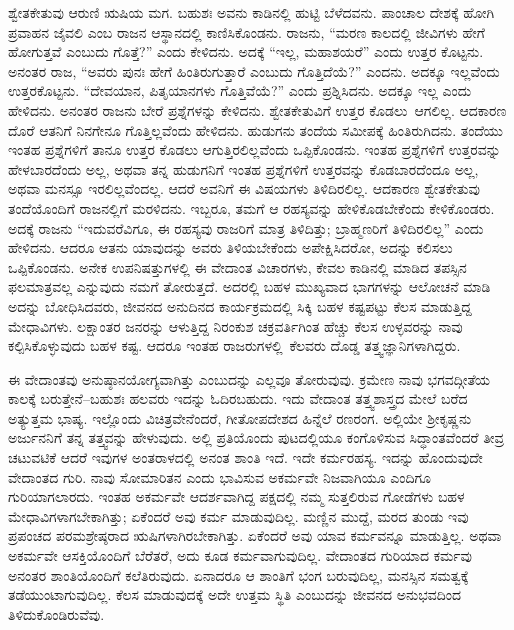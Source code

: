 ಶ್ವೇತಕೇತುವು ಆರುಣಿ ಋಷಿಯ ಮಗ. ಬಹುಶಃ ಅವನು ಕಾಡಿನಲ್ಲಿ ಹುಟ್ಟಿ ಬೆಳೆದವನು. ಪಾಂಚಾಲ ದೇಶಕ್ಕೆ ಹೋಗಿ ಪ್ರವಾಹನ ಜೈವಲಿ ಎಂಬ ರಾಜನ ಆಸ್ಥಾನದಲ್ಲಿ ಕಾಣಿಸಿಕೊಂಡನು. ರಾಜನು, “ಮರಣ ಕಾಲದಲ್ಲಿ ಜೀವಿಗಳು ಹೇಗೆ ಹೋಗುತ್ತವೆ ಎಂಬುದು ಗೊತ್ತೆ?” ಎಂದು ಕೇಳಿದನು. ಅದಕ್ಕೆ “ಇಲ್ಲ, ಮಹಾಶಯರೆ” ಎಂದು ಉತ್ತರ ಕೊಟ್ಟನು. ಅನಂತರ ರಾಜ, “ಅವರು ಪುನಃ ಹೇಗೆ ಹಿಂತಿರುಗುತ್ತಾರೆ ಎಂಬುದು ಗೊತ್ತಿದೆಯೆ?” ಎಂದನು. ಅದಕ್ಕೂ ಇಲ್ಲವೆಂದು ಉತ್ತರಕೊಟ್ಟನು. “ದೇವಯಾನ, ಪಿತೃಯಾನಗಳು ಗೊತ್ತಿವೆಯೆ?” ಎಂದು ಪ್ರಶ್ನಿಸಿದನು. ಅದಕ್ಕೂ ಇಲ್ಲ ಎಂದು ಹೇಳಿದನು. ಅನಂತರ ರಾಜನು ಬೇರೆ ಪ್ರಶ್ನೆಗಳನ್ನು ಕೇಳಿದನು. ಶ್ವೇತಕೇತುವಿಗೆ ಉತ್ತರ ಕೊಡಲು\break\ ಆಗಲಿಲ್ಲ. ಆದಕಾರಣ ದೊರೆ ಆತನಿಗೆ ನಿನಗೇನೂ ಗೊತ್ತಿಲ್ಲವೆಂದು ಹೇಳಿದನು. ಹುಡುಗನು ತಂದೆಯ ಸಮೀಪಕ್ಕೆ ಹಿಂತಿರುಗಿದನು. ತಂದೆಯು ಇಂತಹ ಪ್ರಶ್ನೆಗಳಿಗೆ ತಾನೂ ಉತ್ತರ ಕೊಡಲು ಆಗುತ್ತಿರಲಿಲ್ಲವೆಂದು ಒಪ್ಪಿಕೊಂಡನು. ಇಂತಹ ಪ್ರಶ್ನೆಗಳಿಗೆ ಉತ್ತರವನ್ನು ಹೇಳಬಾರದೆಂದು ಅಲ್ಲ, ಅಥವಾ ತನ್ನ ಹುಡುಗನಿಗೆ ಇಂತಹ ಪ್ರಶ್ನೆಗಳಿಗೆ ಉತ್ತರವನ್ನು ಕೊಡಬಾರದೆಂದೂ ಅಲ್ಲ, ಅಥವಾ ಮನಸ್ಸೂ ಇರಲಿಲ್ಲವೆಂದಲ್ಲ. ಆದರೆ ಅವನಿಗೆ ಈ ವಿಷಯಗಳು ತಿಳಿದಿರಲಿಲ್ಲ. ಆದಕಾರಣ ಶ್ವೇತಕೇತುವು ತಂದೆಯೊಂದಿಗೆ ರಾಜನಲ್ಲಿಗೆ ಮರಳಿದನು. ಇಬ್ಬರೂ, ತಮಗೆ ಆ ರಹಸ್ಯವನ್ನು ಹೇಳಿಕೊಡಬೇಕೆಂದು ಕೇಳಿಕೊಂಡರು. ಅದಕ್ಕೆ ರಾಜನು “ಇದುವರೆವಿಗೂ, ಈ ರಹಸ್ಯವು ರಾಜರಿಗೆ ಮಾತ್ರ ತಿಳಿದಿತ್ತು; ಬ್ರಾಹ್ಮಣರಿಗೆ ತಿಳಿದಿರಲಿಲ್ಲ” ಎಂದು ಹೇಳಿದನು. ಆದರೂ ಆತನು ಯಾವುದನ್ನು ಅವರು ತಿಳಿಯಬೇಕೆಂದು ಅಪೇಕ್ಷಿಸಿದರೋ, ಅದನ್ನು ಕಲಿಸಲು ಒಪ್ಪಿಕೊಂಡನು. ಅನೇಕ ಉಪನಿಷತ್ತುಗಳಲ್ಲಿ ಈ ವೇದಾಂತ ವಿಚಾರಗಳು, ಕೇವಲ ಕಾಡಿನಲ್ಲಿ ಮಾಡಿದ ತಪಸ್ಸಿನ ಫಲಮಾತ್ರವಲ್ಲ ಎನ್ನುವುದು ನಮಗೆ ತೋರುತ್ತದೆ. ಅದರಲ್ಲಿ ಬಹಳ ಮುಖ್ಯವಾದ ಭಾಗಗಳನ್ನು ಆಲೋಚನೆ ಮಾಡಿ ಅದನ್ನು ಬೋಧಿಸಿದವರು, ಜೀವನದ ಅನುದಿನದ ಕಾರ್ಯಕ್ರಮದಲ್ಲಿ ಸಿಕ್ಕಿ ಬಹಳ ಕಷ್ಟಪಟ್ಟು ಕೆಲಸ ಮಾಡುತ್ತಿದ್ದ ಮೇಧಾವಿಗಳು. ಲಕ್ಷಾಂತರ ಜನರನ್ನು ಆಳುತ್ತಿದ್ದ ನಿರಂಕುಶ ಚಕ್ರವರ್ತಿಗಿಂತ ಹೆಚ್ಚು ಕೆಲಸ ಉಳ್ಳವರನ್ನು ನಾವು ಕಲ್ಪಿಸಿಕೊಳ್ಳುವುದು ಬಹಳ ಕಷ್ಟ. ಆದರೂ ಇಂತಹ ರಾಜರುಗಳಲ್ಲಿ\break\  ಕೆಲವರು ದೊಡ್ಡ ತತ್ತ್ವಜ್ಞಾನಿಗಳಾಗಿದ್ದರು. 

\vskip  0.4cm

ಈ ವೇದಾಂತವು ಅನುಷ್ಠಾನಯೋಗ್ಯವಾಗಿತ್ತು ಎಂಬುದನ್ನು ಎಲ್ಲವೂ ತೋರುವುವು. ಕ್ರಮೇಣ ನಾವು ಭಗವದ್ಗೀತೆಯ ಕಾಲಕ್ಕೆ ಬರುತ್ತೇನೆ–ಬಹುಶಃ ಹಲವರು ಇದನ್ನು ಓದಿರಬಹುದು. ಇದು ವೇದಾಂತ ತತ್ತ್ವಶಾಸ್ತ್ರದ ಮೇಲೆ ಬರೆದ ಅತ್ಯುತ್ತಮ ಭಾಷ್ಯ. ಇಲ್ಲೊಂದು ವಿಚಿತ್ರವೇನೆಂದರೆ, ಗೀತೋಪದೇಶದ ಹಿನ್ನೆಲೆ ರಣರಂಗ. ಅಲ್ಲಿಯೇ ಶ‍್ರೀಕೃಷ್ಣನು ಅರ್ಜುನನಿಗೆ ತನ್ನ ತತ್ತ್ವವನ್ನು ಹೇಳುವುದು. ಅಲ್ಲಿ ಪ್ರತಿಯೊಂದು ಪುಟದಲ್ಲಿಯೂ ಕಂಗೊಳಿಸುವ ಸಿದ್ಧಾಂತವೆಂದರೆ ತೀವ್ರ ಚಟುವಟಿಕೆ ಆದರೆ ಇವುಗಳ ಅಂತರಾಳದಲ್ಲಿ ಅನಂತ ಶಾಂತಿ ಇದೆ. ಇದೇ ಕರ್ಮರಹಸ್ಯ. ಇದನ್ನು ಹೊಂದುವುದೇ ವೇದಾಂತದ ಗುರಿ. ನಾವು ಸೋಮಾರಿತನ ಎಂದು ಭಾವಿಸುವ ಅಕರ್ಮವೇ ನಿಜವಾಗಿಯೂ ಎಂದಿಗೂ ಗುರಿಯಾಗಲಾರದು. ಇಂತಹ ಅಕರ್ಮವೇ ಆದರ್ಶವಾಗಿದ್ದ ಪಕ್ಷದಲ್ಲಿ ನಮ್ಮ ಸುತ್ತಲಿರುವ ಗೋಡೆಗಳು ಬಹಳ ಮೇಧಾವಿಗಳಾಗಬೇಕಾಗಿತ್ತು; ಏಕೆಂದರೆ ಅವು ಕರ್ಮ ಮಾಡುವುದಿಲ್ಲ. ಮಣ್ಣಿನ ಮುದ್ದೆ, ಮರದ ತುಂಡು ಇವು ಪ್ರಪಂಚದ ಪರಮಶ್ರೇಷ್ಠರಾದ ಋಷಿಗಳಾಗಿರಬೇಕಾಗಿತ್ತು. ಏಕೆಂದರೆ ಅವು ಯಾವ ಕರ್ಮವನ್ನೂ ಮಾಡುತ್ತಿಲ್ಲ. ಅಥವಾ ಅಕರ್ಮವೇ ಆಸಕ್ತಿಯೊಂದಿಗೆ ಬೆರೆತರೆ, ಅದು ಕೂಡ ಕರ್ಮವಾಗುವುದಿಲ್ಲ. ವೇದಾಂತದ ಗುರಿಯಾದ ಕರ್ಮವು ಅನಂತರ ಶಾಂತಿಯೊಂದಿಗೆ ಕಲೆತಿರುವುದು. ಏನಾದರೂ ಆ ಶಾಂತಿಗೆ ಭಂಗ ಬರುವುದಿಲ್ಲ, ಮನಸ್ಸಿನ ಸಮತ್ವಕ್ಕೆ ತಡೆಯುಂಟಾಗುವುದಿಲ್ಲ. ಕೆಲಸ ಮಾಡುವುದಕ್ಕೆ ಅದೇ ಉತ್ತಮ ಸ್ಥಿತಿ ಎಂಬುದನ್ನು ಜೀವನದ ಅನುಭವದಿಂದ ತಿಳಿದುಕೊಂಡಿರುವೆವು. 

